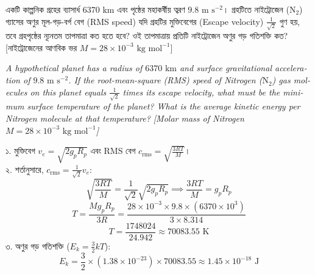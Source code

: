 \documentclass[12pt, a4paper]{article}
\begin{document}
\vspace{1.5em}

\begin{tcolorbox}[questionbox={প্রশ্ন (Question) 6}]
\noindent
একটি কাল্পনিক গ্রহের ব্যাসার্ধ $6370\text{ km}$ এবং পৃষ্ঠের মহাকর্ষীয় ত্বরণ $9.8\text{ m s}^{-2}$। গ্রহটিতে নাইট্রোজেন ($\text{N}_2$) গ্যাসের অণুর মূল-গড়-বর্গ বেগ (RMS speed) যদি গ্রহটির মুক্তিবেগের (Escape velocity) $\frac{1}{\sqrt{2}}$ গুণ হয়, তবে গ্রহপৃষ্ঠের ন্যূনতম তাপমাত্রা কত হতে হবে? ওই তাপমাত্রায় প্রতিটি নাইট্রোজেন অণুর গড় গতিশক্তি কত? [নাইট্রোজেনের আণবিক ভর $M = 28 \times 10^{-3}\text{ kg mol}^{-1}$]

\vspace{0.8em}
\begin{english}
\noindent\textit{\color{darkgray}
A hypothetical planet has a radius of $6370\text{ km}$ and surface gravitational acceleration of $9.8\text{ m s}^{-2}$. If the root-mean-square (RMS) speed of Nitrogen ($\text{N}_2$) gas molecules on this planet equals $\frac{1}{\sqrt{2}}$ times its escape velocity, what must be the minimum surface temperature of the planet? What is the average kinetic energy per Nitrogen molecule at that temperature? [Molar mass of Nitrogen $M = 28 \times 10^{-3}\text{ kg mol}^{-1}$]
}
\end{english}
\end{tcolorbox}

\vspace{1em}

\begin{tcolorbox}[solutionbox={সমাধান (Solution)}]
\noindent
১. মুক্তিবেগ $v_e = \sqrt{2 g_p R_p}$ এবং RMS বেগ $c_{\text{rms}} = \sqrt{\frac{3 R T}{M}}$। \\
২. শর্তানুসারে, $c_{\text{rms}} = \frac{1}{\sqrt{2}} v_e$:
\[ \sqrt{\frac{3 R T}{M}} = \frac{1}{\sqrt{2}} \sqrt{2 g_p R_p} \implies \frac{3 R T}{M} = g_p R_p \]
\[ T = \frac{M g_p R_p}{3 R} = \frac{28 \times 10^{-3} \times 9.8 \times (6370 \times 10^3)}{3 \times 8.314} \]
\[ T = \frac{1748024}{24.942} \approx 70083.55\text{ K} \]
৩. অণুর গড় গতিশক্তি ($E_k = \frac{3}{2} k T$):
\[ E_k = \frac{3}{2} \times (1.38 \times 10^{-23}) \times 70083.55 \approx 1.45 \times 10^{-18}\text{ J} \]
\end{tcolorbox}

\vspace{1.5em}
\end{document}
